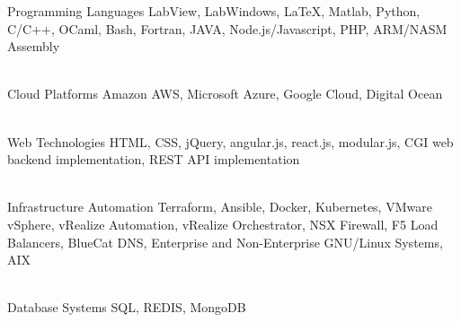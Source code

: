 


\begin{cvskills}


\cvskill
{Programming Languages} %
{LabView, LabWindows,  \LaTeX, Matlab, Python, C/C++, OCaml, Bash, Fortran, JAVA, Node.js/Javascript, PHP,  \newline ARM/NASM Assembly} %

\\


\cvskill
{Cloud Platforms} %
{Amazon AWS, Microsoft Azure, Google Cloud, Digital Ocean} %

\\


\cvskill
{Web Technologies} %
{HTML, CSS, jQuery, angular.js, react.js, modular.js, CGI web backend implementation, \newline REST API implementation} %

\\


\cvskill
{Infrastructure Automation} %
{Terraform, Ansible, Docker, Kubernetes, VMware vSphere, vRealize Automation, \newline vRealize Orchestrator, NSX Firewall, F5 Load Balancers, BlueCat DNS, \newline Enterprise and Non-Enterprise GNU/Linux Systems, AIX} %

\\


\cvskill
{Database Systems} %
{SQL, REDIS, MongoDB} %


\end{cvskills}
